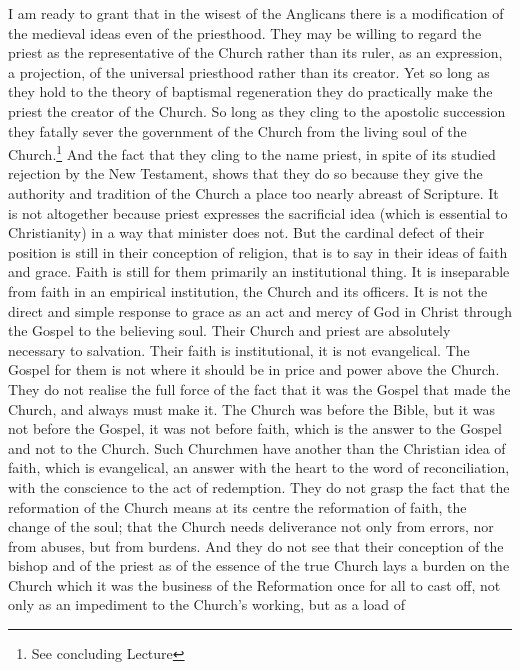 \documentclass[12pt,a5paper,twoside]{book}
\begin{document}
I am ready to grant that in the wisest of the Anglicans 
there is a modification of the medieval ideas even 
of the priesthood. They may be willing to regard the 
priest as the representative of the Church rather than 
its ruler, as an expression, a projection, of the universal 
priesthood rather than its creator. Yet so long as they 
hold to the theory of baptismal regeneration they do 
practically make the priest the creator of the Church. 
So long as they cling to the apostolic succession they 
fatally sever the government of the Church from the 
living soul of the Church.\footnote{See concluding Lecture}
And the fact that they 
cling to the name priest, in spite of its studied rejection 
by the New Testament, shows that they do so 
because they give the authority and tradition of the 
Church a place too nearly abreast of Scripture. It is 
not altogether because priest expresses the sacrificial 
idea (which is essential to Christianity) in a way that 
minister does not. But the cardinal defect of their 
position is still in their conception of religion, that is 
to say in their ideas of faith and grace. Faith is still 
for them primarily an institutional thing. It is inseparable 
from faith in an empirical institution, the 
Church and its officers. It is not the direct and simple 
response to grace as an act and mercy of God in Christ 
through the Gospel to the believing soul. Their 
Church and priest are absolutely necessary to salvation. 
Their faith is institutional, it is not evangelical. The 
Gospel for them is not where it should be in price 
and power above the Church. They do not realise 
the full force of the fact that it was the Gospel that 
made the Church, and always must make it. The 
Church was before the Bible, but it was not before the 
Gospel, it was not before faith, which is the answer to 
the Gospel and not to the Church. Such Churchmen 
have another than the Christian idea of faith, which is 
evangelical, an answer with the heart to the word of 
reconciliation, with the conscience to the act of redemption. 
They do not grasp the fact that the 
reformation of the Church means at its centre the 
reformation of faith, the change of the soul; that the 
Church needs deliverance not only from errors, nor 
from abuses, but from burdens. And they do not see 
that their conception of the bishop and of the priest 
as of the essence of the true Church lays a burden on 
the Church which it was the business of the Reformation 
once for all to cast off, not only as an impediment 
to the Church's working, but as a load of 
\end{document}
